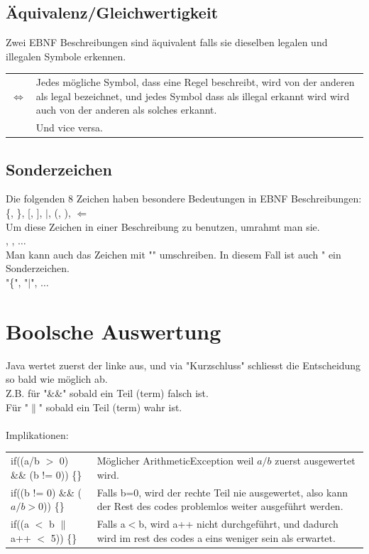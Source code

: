 \documentclass[12pt,a4paper]{article}
\begin{document}
\subsection{Äquivalenz/Gleichwertigkeit}
Zwei EBNF Beschreibungen sind äquivalent falls sie dieselben legalen und illegalen Symbole erkennen.\\
\begin{tabularx}{\linewidth}{l X}
$\iff$ & Jedes mögliche Symbol, dass eine Regel beschreibt, wird von der anderen als legal bezeichnet, und jedes Symbol dass als illegal erkannt wird wird auch von der anderen als solches erkannt.\\
& Und vice versa. %
\end{tabularx}
\subsection{Sonderzeichen}
Die folgenden 8 Zeichen haben besondere Bedeutungen in EBNF Beschreibungen:\\
\hspace*{1cm} \{, \}, [, ], $\mid$, (, ), $\Leftarrow$\\
Um diese Zeichen in einer Beschreibung zu benutzen, umrahmt man sie.\\
\hspace*{1cm} \fbox{\{}, \fbox{$\mid$}, $\hdots$\\
Man kann auch das Zeichen mit "" umschreiben. In diesem Fall ist auch " ein Sonderzeichen.\\ %
\hspace*{1cm} "\{", "$\mid$", $\hdots$
\newpage
\section{Boolsche Auswertung}
Java wertet zuerst der linke aus, und via "Kurzschluss" schliesst die Entscheidung so bald wie möglich ab.\\
\hspace*{1cm} Z.B. für "\&\&" sobald ein Teil (term) falsch ist.\\
\hspace*{1cm} Für "$\|$" sobald ein Teil (term) wahr ist.\\\\
Implikationen:\\
\begin{tabularx}{\linewidth}{l X}
if((a/b $>$ 0) \&\& (b != 0)) \{\} & Möglicher ArithmeticException weil $a/b$ zuerst ausgewertet wird.\\
if((b != 0) \&\& ($a/b > 0$)) \{\} & Falls b=0, wird der rechte Teil nie ausgewertet, also kann der Rest des codes problemlos weiter ausgeführt werden.\\
if((a $<$ b $\|$ a++ $<$ 5)) \{\} & Falls a$<$b, wird a++ nicht durchgeführt, und dadurch wird im rest des codes a eins weniger sein als erwartet.
\end{tabularx}
\newpage
\end{document}
